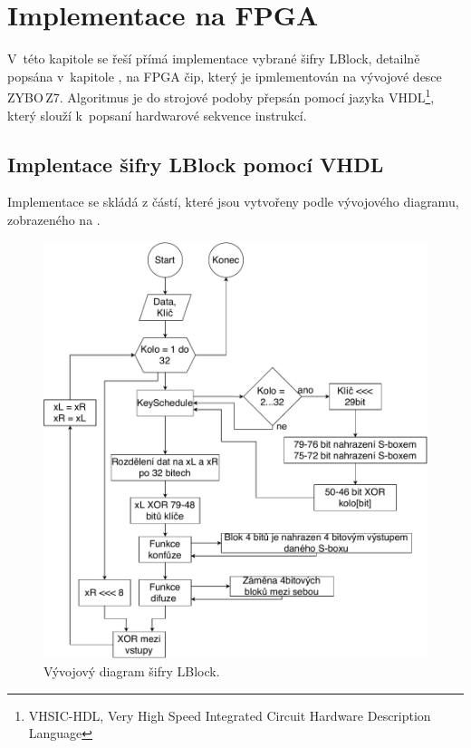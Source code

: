 \chapter{Implementace na FPGA}
V~této kapitole se řeší přímá implementace vybrané šifry LBlock, detailně popsána v~kapitole , na FPGA čip, který je ipmlementován na vývojové desce ZYBO\,Z7. Algoritmus je do strojové podoby přepsán pomocí jazyka VHDL\footnote{VHSIC-HDL, Very High Speed Integrated Circuit Hardware Description Language}, který slouží k~popsaní hardwarové sekvence instrukcí.
\section{Implentace šifry LBlock pomocí VHDL}
Implementace se skládá z částí, které jsou vytvořeny podle vývojového diagramu, zobrazeného na .
\begin{figure}[!h]
  \begin{center}
    \includegraphics[scale=0.55]{obrazky/vyvojovyDiagram.pdf}
  \end{center}
  \caption[Vývojový diagram šifry LBlock]{Vývojový diagram šifry LBlock.}
  \label{img:vyvojovyDiagram}
\end{figure}

